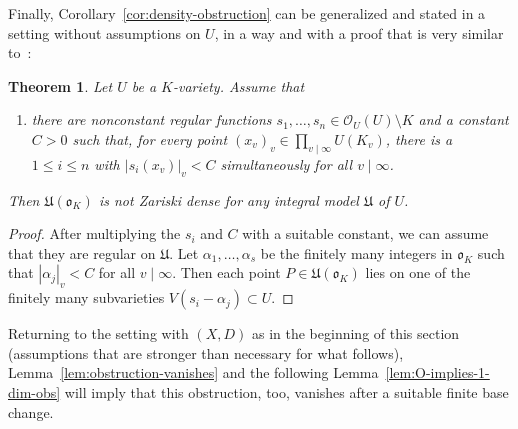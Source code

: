\documentclass[a4paper, twoside, 10pt]{amsart}
\newcommand{\cO}{\mathcal{O}}
\newcommand{\mU}{\mathfrak{U}}
\newcommand{\fo}{\mathfrak{o}}
\newcommand{\abs}[1]{\left\lvert#1\right\rvert}
\newtheorem{theorem}{Theorem}[subsection]
\theoremstyle{definition}
\begin{document}
Finally, Corollary~\ref{cor:density-obstruction} can be generalized and stated in a setting without assumptions on $U$, in a way and with a proof that is very similar to~\cite{MR3736498}:

\begin{theorem}\label{thm:var-density-obstruction}
  Let $U$ be a $K$-variety. Assume that 
  \begin{enumerate}[label = (\Alph*), start = 15]
    \item\label{enum:obstruction-assumption} there are nonconstant regular functions $s_1,\dots,s_n\in \cO_U(U)\setminus K$ and a constant $C>0$ such that, for every point
    $(x_v)_v\in \prod_{v\mid\infty} U(K_v)$, there is a $1\le i\le n$ with $\abs{s_i(x_v)}_v< C$ simultaneously for all $v\mid\infty$.
  \end{enumerate} Then $\mU(\fo_K)$ is not Zariski dense for any integral model $\mU$ of $U$.
\end{theorem}
\begin{proof}
  After multiplying the $s_i$ and $C$ with a suitable constant, we can assume that they are regular on $\mU$. Let $\alpha_1,\dots,\alpha_s$ be the finitely many integers in $\fo_K$ such that $\abs{\alpha_j}_v < C$ for all $v\mid\infty$. Then each point $P\in\mU(\fo_K)$ lies on one of the finitely many subvarieties
  $V(s_i-\alpha_j)\subset U$.
\end{proof}

Returning to the setting with $(X,D)$ as in the beginning of this section (assumptions that are stronger than necessary for what follows), Lemma~\ref{lem:obstruction-vanishes} and the following Lemma~\ref{lem:O-implies-1-dim-obs} will imply that this obstruction, too, vanishes after a suitable finite base change.
\end{document}
